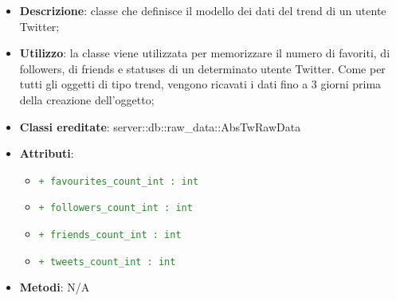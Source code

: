 			\begin{itemize}
				\item \textbf{Descrizione}: classe che definisce il modello dei dati del trend di un utente Twitter;
				\item \textbf{Utilizzo}: la classe viene utilizzata per memorizzare il numero di favoriti, di followers, di friends e statuses di un determinato utente Twitter. Come per tutti gli oggetti di tipo trend, vengono ricavati i dati fino a 3 giorni prima della creazione dell'oggetto;
				\item \textbf{Classi ereditate}: server::db::raw\_data::AbsTwRawData
				\item \textbf{Attributi}:
					\begin{itemize}
						\item \textcolor{forestgreen}{\texttt{+ favourites\_count\_int : int}}
						\item \textcolor{forestgreen}{\texttt{+ followers\_count\_int : int}}
						\item \textcolor{forestgreen}{\texttt{+ friends\_count\_int : int}}
						\item \textcolor{forestgreen}{\texttt{+ tweets\_count\_int : int}}
					\end{itemize}
				\item \textbf{Metodi}: N/A
			\end{itemize}


